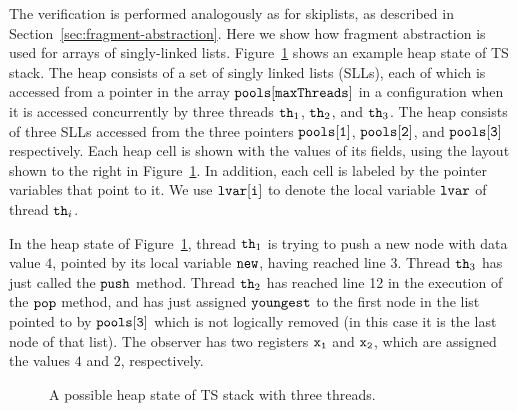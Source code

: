  The verification is performed analogously as for skiplists, as described
 in Section~\ref{sec:fragment-abstraction}. Here we show how fragment
 abstraction is used for arrays of singly-linked lists.
Figure~\ref{fig:tsshape} shows an  example heap state of TS stack.
The heap consists of a set of singly linked lists (SLLs), each of which
is accessed from a pointer in the array ${\tt pools[maxThreads]}$
in a configuration when %
it is accessed concurrently by three threads ${\tt th}_1$, ${\tt th}_2$, and ${\tt th}_3$. The heap consists of three SLLs accessed from the three pointers $\tt pools[1]$, $\tt pools[2]$, and $\tt pools[3]$ respectively. Each heap cell is
shown with the values of its fields, using the layout shown to the right in
Figure~\ref{fig:tsshape}.
In addition, each cell is labeled by the pointer variables that point to it.
We use ${\tt lvar[i]}$ to denote the local
variable ${\tt lvar}$ of thread ${\tt th}_i$.

In the heap state of Figure~\ref{fig:tsshape},
thread ${\tt th}_1$ is trying to push a new node with data value $4$, pointed by its local variable $\tt new$, having reached line 3.
Thread ${\tt th}_3$ has just called the ${\tt push}$ method.
Thread ${\tt th}_2$ has reached line 12 in the execution of the ${\tt pop}$ method,  and has just assigned ${\tt youngest}$ to the first node in the list
pointed to by $\tt pools[3]$ which is not logically removed (in this case it is the last node of that list).
The observer has two registers
$\tt x_1$ and $\tt x_2$, which are assigned the values $4$ and $2$,
respectively.

\begin{figure}
\center
	
\caption{A possible heap state of TS stack with three threads.}
\label{fig:tsshape}
\end{figure} 

